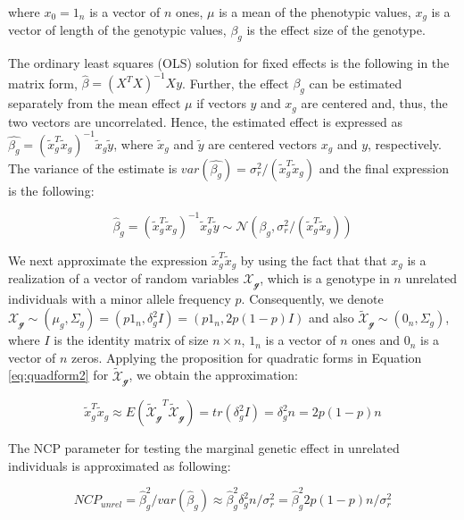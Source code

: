 \documentclass[]{book}
\begin{document}
where \(x_0 = 1_n\) is a vector of \(n\) ones, \(\mu\) is a mean of the
phenotypic values, \(x_g\) is a vector of length of the genotypic
values, \(\beta_g\) is the effect size of the genotype.

The ordinary least squares (OLS) solution for fixed effects is the
following in the matrix form, \(\hat{\beta} = (X^T X)^{-1} X y\).
Further, the effect \(\beta_g\) can be estimated separately from the
mean effect \(\mu\) if vectors \(y\) and \(x_g\) are centered and, thus,
the two vectors are uncorrelated. Hence, the estimated effect is
expressed as
\(\hat{\beta_g} = \left(\tilde{x}_g^T \tilde{x}_g\right)^{-1} \tilde{x}_g \tilde{y}\),
where \(\tilde{x}_g\) and \(\tilde{y}\) are centered vectors \(x_g\) and
\(y\), respectively. The variance of the estimate is
\(var(\hat{\beta_g}) = \sigma_r^2 / (\tilde{x}_g^T \tilde{x}_g)\) and
the final expression is the following:

\begin{equation}
  \hat{\beta}_g  = \left(\tilde{x}_g^T \tilde{x}_g\right)^{-1} \tilde{x}_g^T \tilde{y} \sim \mathcal{N} (\beta_g, \sigma_r^2 / (\tilde{x}_g^T \tilde{x}_g))
\label{eq:betahatlmg}
\end{equation}

We next approximate the expression \(\tilde{x}_g^T \tilde{x}_g\) by
using the fact that that \(x_g\) is a realization of a vector of random
variables \(\mathcal{X_g}\), which is a genotype in \(n\) unrelated
individuals with a minor allele frequency \(p\). Consequently, we denote
\(\mathcal{X_g} \sim (\mu_g, \Sigma_g) = (p 1_n, \delta_g^2 I) = (p 1_n, 2 p (1-p) I)\)
and also \(\mathcal{\tilde{X}_g} \sim (0_n, \Sigma_g)\), where \(I\) is
the identity matrix of size \(n \times n\), \(1_n\) is a vector of \(n\)
ones and \(0_n\) is a vector of \(n\) zeros. Applying the proposition
for quadratic forms in Equation \eqref{eq:quadform2} for
\(\mathcal{\tilde{X}_g}\), we obtain the approximation:

\begin{equation}
\tilde{x}_g^T \tilde{x}_g \approx E(\mathcal{\tilde{X}_g}^T \mathcal{\tilde{X}_g}) = tr(\delta_g^2 I) = \delta_g^2 n = 2 p (1 - p) n
\label{eq:varbetahatlmg}
\end{equation}

The NCP parameter for testing the marginal genetic effect in unrelated
individuals is approximated as following:

\begin{equation}
NCP_{unrel} = \hat{\beta}_g^2 / var(\hat{\beta}_g) \approx \hat{\beta}_g^2 \delta_g^2 n / \sigma_r^2 = \hat{\beta}_g^2 2 p (1 - p) n / \sigma_r^2
\label{eq:ncplmg}
\end{equation}
\end{document}
